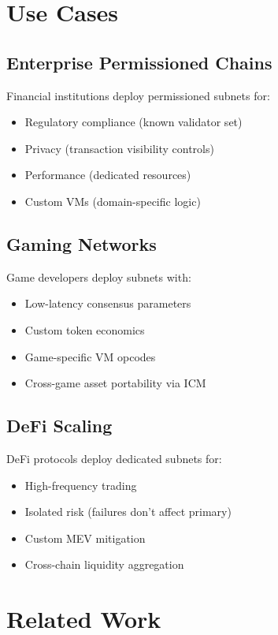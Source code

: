 \documentclass[11pt,a4paper]{article}
\begin{document}
\section{Use Cases}

\subsection{Enterprise Permissioned Chains}

Financial institutions deploy permissioned subnets for:
\begin{itemize}
    \item Regulatory compliance (known validator set)
    \item Privacy (transaction visibility controls)
    \item Performance (dedicated resources)
    \item Custom VMs (domain-specific logic)
\end{itemize}

\subsection{Gaming Networks}

Game developers deploy subnets with:
\begin{itemize}
    \item Low-latency consensus parameters
    \item Custom token economics
    \item Game-specific VM opcodes
    \item Cross-game asset portability via ICM
\end{itemize}

\subsection{DeFi Scaling}

DeFi protocols deploy dedicated subnets for:
\begin{itemize}
    \item High-frequency trading
    \item Isolated risk (failures don't affect primary)
    \item Custom MEV mitigation
    \item Cross-chain liquidity aggregation
\end{itemize}

\section{Related Work}
\end{document}
